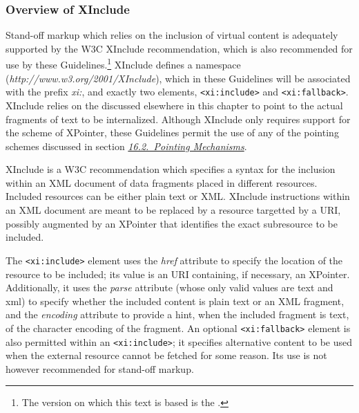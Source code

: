 \subsubsection[{Overview of XInclude }]{Overview of XInclude }\label{SASOov}\par
Stand-off markup which relies on the inclusion of virtual content is adequately supported by the W3C XInclude recommendation, which is also recommended for use by these Guidelines.\footnote{The version on which this text is based is the .} XInclude defines a namespace (\textit{http://www.w3.org/2001/XInclude}), which in these Guidelines will be associated with the prefix \textit{xi:}, and exactly two elements, \texttt{<xi:include>} and \texttt{<xi:fallback>}. XInclude relies on the  discussed elsewhere in this chapter to point to the actual fragments of text to be internalized. Although XInclude only requires support for the  scheme of XPointer, these Guidelines permit the use of any of the pointing schemes discussed in section \textit{\hyperref[SAXP]{16.2.\ Pointing Mechanisms}}.\par
XInclude is a W3C recommendation which specifies a syntax for the inclusion within an XML document of data fragments placed in different resources. Included resources can be either plain text or XML. XInclude instructions within an XML document are meant to be replaced by a resource targetted by a URI, possibly augmented by an XPointer that identifies the exact subresource to be included. \par
The \texttt{<xi:include>} element uses the {\itshape href} attribute to specify the location of the resource to be included; its value is an URI containing, if necessary, an XPointer. Additionally, it uses the {\itshape parse} attribute (whose only valid values are text and xml) to specify whether the included content is plain text or an XML fragment, and the {\itshape encoding} attribute to provide a hint, when the included fragment is text, of the character encoding of the fragment. An optional \texttt{<xi:fallback>} element is also permitted within an \texttt{<xi:include>}; it specifies alternative content to be used when the external resource cannot be fetched for some reason. Its use is not however recommended for stand-off markup.

